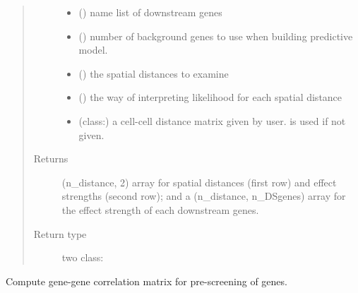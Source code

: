 \documentclass[letterpaper,10pt,english]{sphinxmanual}
\begin{document}
\begin{fulllineitems}
\begin{fulllineitems}
\begin{quote}
\begin{description}
\begin{itemize}
\item {} 
 () \textendash{} name list of downstream genes

\item {} 
 (\sphinxstyleliteralemphasis{, }) \textendash{} number of background genes to use when building predictive model.

\item {} 
 () \textendash{} the spatial distances to examine

\item {} 
 (\sphinxstyleliteralemphasis{, }) \textendash{} the way of interpreting likelihood for each spatial distance

\item {} 
 (class:) \textendash{} a cell-cell distance matrix given by user.  is used if not given.

\end{itemize}

\item[{Returns}] \leavevmode
(n\_distance, 2) array for spatial distances (first row) and effect strengths (second row); and a (n\_distance, n\_DSgenes) array for the effect strength of each downstream genes.

\item[{Return type}] \leavevmode
two class:

\end{description}\end{quote}

\end{fulllineitems}


\begin{fulllineitems}
\label{\detokenize{api:spaotsc.SpaOTsc.spatial_sc.nonspatial_correlation}}
Compute gene-gene correlation matrix for pre-screening of genes.


\end{fulllineitems}
\end{fulllineitems}
\end{document}
